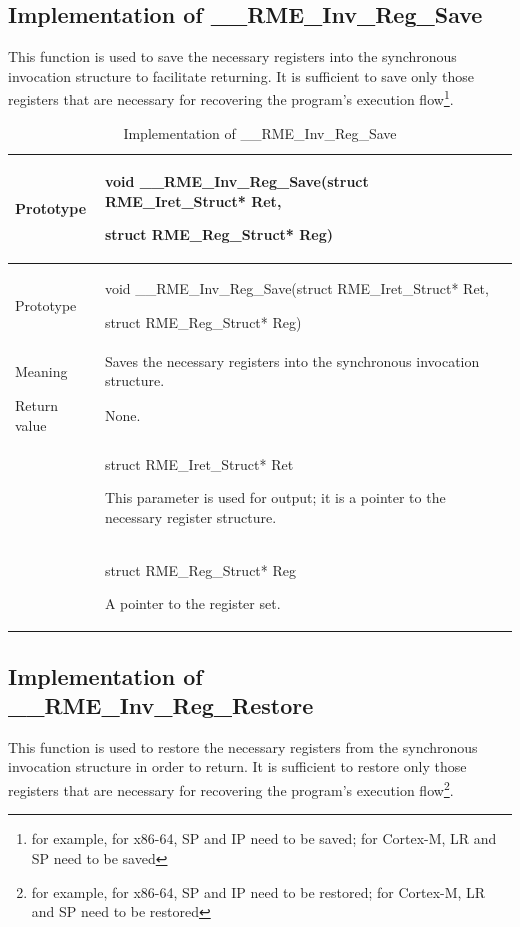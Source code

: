 \subsection{Implementation of \_\_RME\_Inv\_Reg\_Save}\label{subsec:7-rme-inv-reg-save-implementation}

This function is used to save the necessary registers into the synchronous invocation structure to facilitate returning. It is sufficient to save only those registers that are necessary for recovering the program's execution flow\footnote{for example, for x86-64, SP and IP need to be saved; for Cortex-M, LR and SP need to be saved}.

\begin{xltabular}{\textwidth}{@{}>{\hsize\raggedright\arraybackslash}X>{\hsize\raggedright\arraybackslash}X@{}}
\caption{Implementation of \_\_RME\_Inv\_Reg\_Save}\label{tab:7-66-rme-inv-reg-save-implementation}\\
\toprule
Prototype\strut
 & void \_\_RME\_Inv\_Reg\_Save(struct RME\_Iret\_Struct* Ret,

struct RME\_Reg\_Struct* Reg)\strut
\tabularnewline
\endfirsthead
\toprule
Prototype\strut
 & void \_\_RME\_Inv\_Reg\_Save(struct RME\_Iret\_Struct* Ret,

struct RME\_Reg\_Struct* Reg)\strut
\tabularnewline
\midrule
\endhead
\bottomrule
\endlastfoot
Meaning & Saves the necessary registers into the synchronous invocation structure.\tabularnewline
Return value & None.\tabularnewline
{} & struct RME\_Iret\_Struct* Ret

This parameter is used for output; it is a pointer to the necessary register structure.\strut
\tabularnewline
\strut
 & struct RME\_Reg\_Struct* Reg

A pointer to the register set.\strut
\tabularnewline
\end{xltabular}
\nopagebreak[4]

\subsection{Implementation of \_\_RME\_Inv\_Reg\_Restore}\label{subsec:7-rme-inv-reg-restore-implementation}

This function is used to restore the necessary registers from the synchronous invocation structure in order to return. It is sufficient to restore only those registers that are necessary for recovering the program's execution flow\footnote{for example, for x86-64, SP and IP need to be restored; for Cortex-M, LR and SP need to be restored}.


